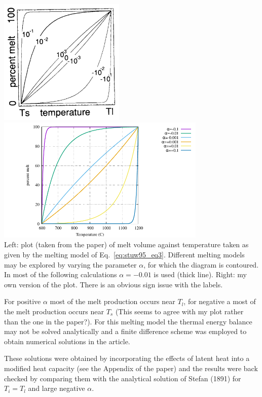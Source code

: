 \begin{center}
\includegraphics[width=6cm]{python_codes/fieldstone_169/images/stuw95a}
\includegraphics[width=10cm]{python_codes/fieldstone_169/images/percent_melt}\\
Left: plot (taken from the paper) of melt volume against temperature taken as given by
the melting model of Eq.~\eqref{eq:stuw95_eq3}. Different melting models may
be explored by varying the parameter $\alpha$, for which the diagram 
is contoured. In most of the following calculations
$\alpha= - 0.01$ is used (thick line).
Right: my own version of the plot. {\color{red} There is an obvious sign issue with the labels}.
\end{center}



For positive $\alpha$ most of the melt production occurs near $T_l$, for negative a most of the
melt production occurs near $T_s$ (This seems to agree with my plot rather than the 
one in the paper?). For this melting
model the thermal energy balance may not be
solved analytically and a finite difference scheme
was employed to obtain numerical solutions in the article.

These solutions were obtained by incorporating the effects of latent heat into a modified heat
capacity (see the Appendix of the paper) and the results were back checked by
comparing them with the analytical solution of
Stefan (1891) for $T_i = T_l$ and large negative $\alpha$.

